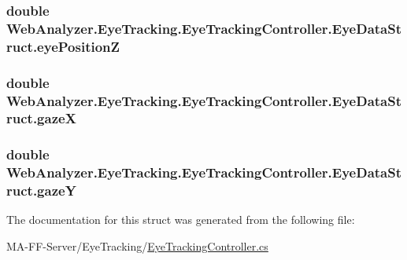 \subsubsection[{eye\+Position\+Z}]{\setlength{\rightskip}{0pt plus 5cm}double Web\+Analyzer.\+Eye\+Tracking.\+Eye\+Tracking\+Controller.\+Eye\+Data\+Struct.\+eye\+Position\+Z}\label{struct_web_analyzer_1_1_eye_tracking_1_1_eye_tracking_controller_1_1_eye_data_struct_a6f66c9c36a4218d94bdd6fb4a4a033b6}
\hypertarget{struct_web_analyzer_1_1_eye_tracking_1_1_eye_tracking_controller_1_1_eye_data_struct_acaec5f71896bd916a0a3f1a49a1d9091}{}
\subsubsection[{gaze\+X}]{\setlength{\rightskip}{0pt plus 5cm}double Web\+Analyzer.\+Eye\+Tracking.\+Eye\+Tracking\+Controller.\+Eye\+Data\+Struct.\+gaze\+X}\label{struct_web_analyzer_1_1_eye_tracking_1_1_eye_tracking_controller_1_1_eye_data_struct_acaec5f71896bd916a0a3f1a49a1d9091}
\hypertarget{struct_web_analyzer_1_1_eye_tracking_1_1_eye_tracking_controller_1_1_eye_data_struct_af906fc37767cfe35becb556afb6242f6}{}
\subsubsection[{gaze\+Y}]{\setlength{\rightskip}{0pt plus 5cm}double Web\+Analyzer.\+Eye\+Tracking.\+Eye\+Tracking\+Controller.\+Eye\+Data\+Struct.\+gaze\+Y}\label{struct_web_analyzer_1_1_eye_tracking_1_1_eye_tracking_controller_1_1_eye_data_struct_af906fc37767cfe35becb556afb6242f6}


The documentation for this struct was generated from the following file\+:\begin{DoxyCompactItemize}
\item 
M\+A-\/\+F\+F-\/\+Server/\+Eye\+Tracking/\hyperlink{_eye_tracking_controller_8cs}{Eye\+Tracking\+Controller.\+cs}\end{DoxyCompactItemize}
